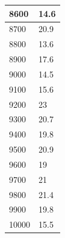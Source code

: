 \begin{center}
\begin{tabularx}{\textwidth}{|X|X|}
        8600 & 14.6 \\ \hline
        8700 & 20.9 \\ \hline
        8800 & 13.6 \\ \hline
        8900 & 17.6 \\ \hline
        9000 & 14.5 \\ \hline
        9100 & 15.6 \\ \hline
        9200 & 23 \\ \hline
        9300 & 20.7 \\ \hline
        9400 & 19.8 \\ \hline
        9500 & 20.9 \\ \hline
        9600 & 19 \\ \hline
        9700 & 21 \\ \hline
        9800 & 21.4 \\ \hline
        9900 & 19.8 \\ \hline
        10000 & 15.5 \\ \hline
    \end{tabularx}
\end{center}
